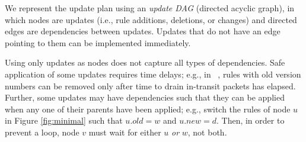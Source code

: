 We represent the update plan using an {\em update DAG} (directed acyclic graph), in which nodes are updates (i.e., rule additions, deletions, or changes) and directed edges are dependencies between updates. Updates that do not have an edge pointing to them can be implemented immediately.

Using only updates as nodes does not capture all types of dependencies. Safe application of some updates requires time delays; e.g., in ~\cite{safeupdate}, rules with old version numbers can be removed only after time to drain in-transit packets has elapsed. Further, some updates may have dependencies such that they can be applied when any one of their parents have been applied; e.g., switch the rules of node $u$ in Figure \ref{fig:minimal} such that $u.old = w$ and $u.new = d$. Then, in order to prevent a loop, node $v$ must wait  for either $u$ \emph{or} $w$, not both.

%


